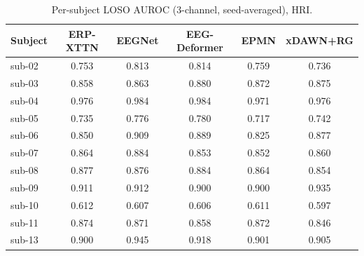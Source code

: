 
\begin{table}[t]
\centering
\scriptsize
\caption{Per-subject LOSO AUROC (3-channel, seed-averaged), HRI.}
\label{tab:persubj-hri}
\begin{tabular}{lccccc}
\toprule
Subject & ERP-XTTN & EEGNet & EEG-Deformer & EPMN & xDAWN+RG \\
\midrule
sub-02 & 0.753 & 0.813 & 0.814 & 0.759 & 0.736 \\
sub-03 & 0.858 & 0.863 & 0.880 & 0.872 & 0.875 \\
sub-04 & 0.976 & 0.984 & 0.984 & 0.971 & 0.976 \\
sub-05 & 0.735 & 0.776 & 0.780 & 0.717 & 0.742 \\
sub-06 & 0.850 & 0.909 & 0.889 & 0.825 & 0.877 \\
sub-07 & 0.864 & 0.884 & 0.853 & 0.852 & 0.860 \\
sub-08 & 0.877 & 0.876 & 0.884 & 0.864 & 0.854 \\
sub-09 & 0.911 & 0.912 & 0.900 & 0.900 & 0.935 \\
sub-10 & 0.612 & 0.607 & 0.606 & 0.611 & 0.597 \\
sub-11 & 0.874 & 0.871 & 0.858 & 0.872 & 0.846 \\
sub-13 & 0.900 & 0.945 & 0.918 & 0.901 & 0.905 \\
\bottomrule
\end{tabular}
\end{table}

